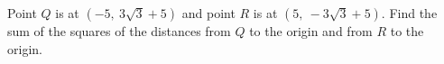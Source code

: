 Point $Q$ is at $\left(-5,\ 3\sqrt3+5\right)$ and point $R$ is at $\left(5,\ -3\sqrt3+5\right)$. Find the sum of the squares of the distances from $Q$ to the origin and from $R$ to the origin.
